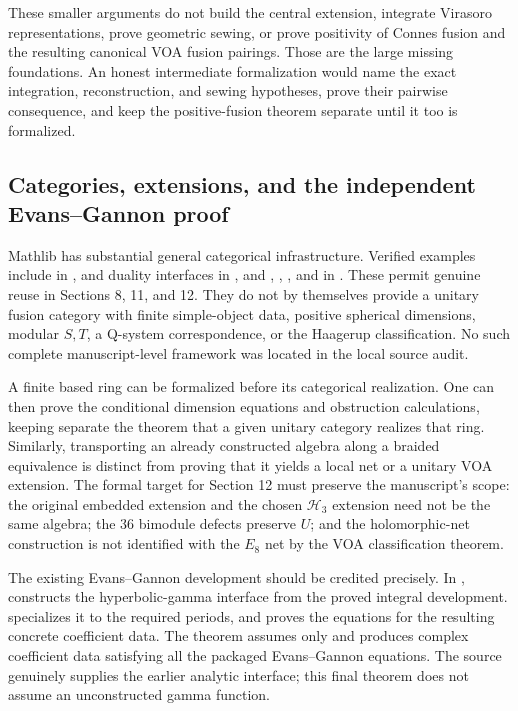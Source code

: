 These smaller arguments do not build the central extension, integrate
Virasoro representations, prove geometric sewing, or prove positivity
of Connes fusion and the resulting canonical VOA fusion pairings.
Those are the large missing foundations. An honest intermediate
formalization would name the exact integration, reconstruction, and
sewing hypotheses, prove their pairwise consequence, and keep the
positive-fusion theorem separate until it too is formalized.

\subsection{Categories, extensions, and the independent Evans--Gannon proof}

Mathlib has substantial general categorical infrastructure. Verified
examples include  in
,
 and duality interfaces in
, and
, ,
, and
 in
.
These permit genuine reuse in Sections 8, 11, and 12. They do not by
themselves provide a unitary fusion category with finite simple-object
data, positive spherical dimensions, modular $S,T$, a Q-system
correspondence, or the Haagerup classification. No such complete
manuscript-level framework was located in the local source audit.

A finite based ring can be formalized before its categorical realization.
One can then prove the conditional dimension equations and obstruction
calculations, keeping separate the theorem that a given unitary
category realizes that ring. Similarly, transporting an already
constructed algebra along a braided equivalence is distinct from
proving that it yields a local net or a unitary VOA extension.
The formal target for Section 12 must preserve the manuscript's scope:
the original embedded extension and the chosen $\mathcal H_3$
extension need not be the same algebra; the 36 bimodule defects
preserve $U$; and the holomorphic-net construction is not identified
with the $E_8$ net by the VOA classification theorem.

The existing Evans--Gannon development should be credited precisely.
In ,
 constructs the
hyperbolic-gamma interface from the proved integral development.
 specializes it to the
required periods, and 
proves the equations for the resulting concrete coefficient data.
The theorem  assumes only
 and produces complex coefficient data satisfying all
the packaged Evans--Gannon equations. The source genuinely supplies
the earlier analytic interface; this final theorem does not assume
an unconstructed gamma function.

